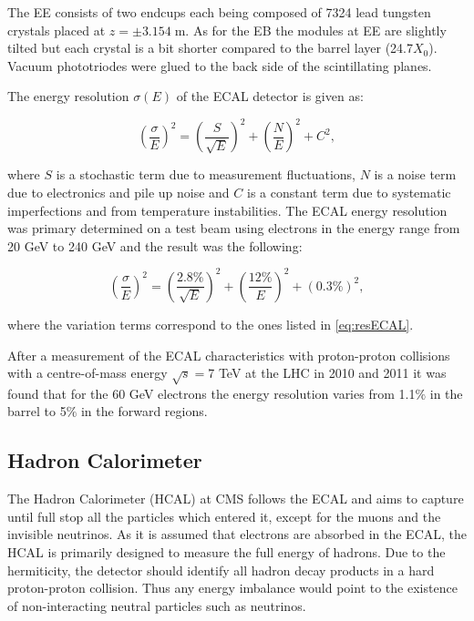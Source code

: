 The EE consists of two endcups each being composed of 7324 lead tungsten crystals placed at $z = \pm 3.154\;$m. As for the EB the modules
at EE are slightly tilted but each crystal is a bit shorter compared to the barrel layer (24.7$X_{0}$). Vacuum phototriodes\cite{APDVPT} were
glued to the back side of the scintillating planes.

The energy resolution $\sigma(E)$ of the ECAL detector is given as\cite{CMSatLHC}:

\begin{equation}\label{eq:resECAL}
  (\frac{\sigma}{E})^{2} = (\frac{S}{\sqrt{E}})^{2} + (\frac{N}{E})^{2} + C^{2},
\end{equation} 

where $S$ is a stochastic term due to measurement fluctuations, $N$ is a noise term due to electronics and pile up noise
and $C$ is a constant term due to systematic imperfections and from temperature instabilities. 
The ECAL energy resolution was primary determined on a test beam using 
electrons in the energy range from 20 GeV to 240 GeV\cite{ECALres2007} and the result was the following:

\begin{equation}\label{eq:resECAL}
  (\frac{\sigma}{E})^{2} = (\frac{2.8\%}{\sqrt{E}})^{2} + (\frac{12\%}{E})^{2} + (0.3\%)^{2},
\end{equation}

where the variation terms correspond to the ones listed in \ref{eq:resECAL}.

After a measurement of the ECAL characteristics with proton-proton collisions with a centre-of-mass energy $\sqrt{s} = $7 TeV
at the LHC in 2010 and 2011 it was found that for the 60 GeV electrons the energy resolution varies from 1.1$\%$ in the barrel 
to 5$\%$ in the forward regions\cite{ECALres2013}.

\subsection{Hadron Calorimeter}

The Hadron Calorimeter (HCAL)\cite{CMSatLHC} at CMS follows the ECAL and aims to capture until full stop all the particles which entered it, 
except for the muons and the invisible neutrinos. As it is assumed that electrons are absorbed in the ECAL, the HCAL is primarily designed 
to measure the full energy of hadrons. Due to the hermiticity, the detector should identify all hadron decay products in a hard proton-proton
collision. Thus any energy imbalance would point to the existence of non-interacting neutral particles such as neutrinos.

